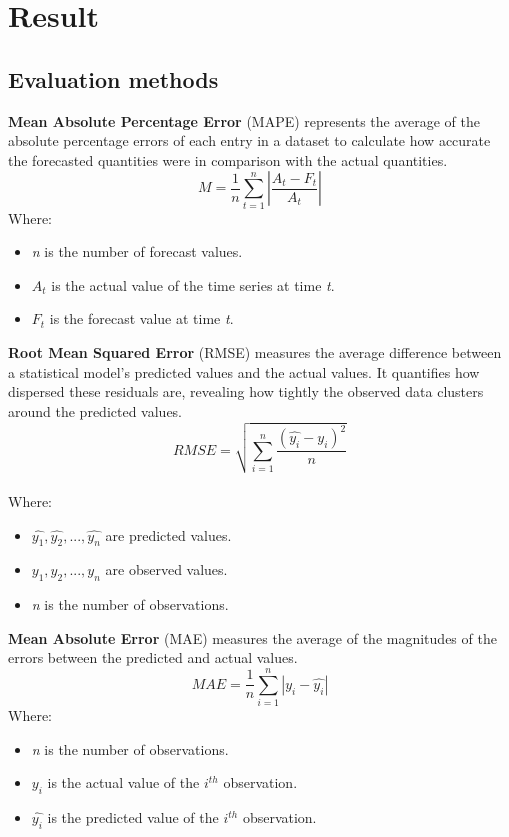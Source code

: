 \documentclass{ieeeojies}
\begin{document}
\section{Result}
\subsection{Evaluation methods}
\textbf{Mean Absolute Percentage  Error} (MAPE) represents the average of the absolute percentage errors of each entry in a dataset to calculate how accurate the forecasted quantities were in comparison with the actual quantities.\\
\[ M = \frac{1}{n} \sum_{t=1}^{n} \left| \frac{A_{t} - F_{t}}{A_{t}} \right| \]
\newline Where:
\begin{itemize}
	\item \textit{n} is the number of forecast values.
	\item $A_{t}$ is the actual value of the time series at time \textit{t}.
	\item $F_{t}$ is the forecast value at time \textit{t}.
\end{itemize}
\textbf{Root Mean Squared Error} (RMSE) measures the average difference between a statistical model’s predicted values and the actual values. It quantifies how dispersed these residuals are, revealing how tightly the observed data clusters around the predicted values.\\
\[RMSE=\sqrt{\sum_{i=1}^{n} \frac{(\hat{y_i}-y_i )^2}{n} }\]\\
\newline Where:
\begin{itemize}
	\item $\hat{y_1}, \hat{y_2}, ..., \hat{y_n}$ are predicted values.
	\item ${y_1}, {y_2}, ..., {y_n}$ are observed values.
	\item \textit{n} is the number of observations.
\end{itemize}
\textbf{Mean Absolute Error} (MAE) measures the average of the magnitudes of the errors between the predicted and actual values.\\
\[MAE=\frac{1}{n}\sum_{i=1}^{n}|y_i - 
\hat{y_i}|\]
\newline Where:
\begin{itemize}
	\item \textit{n} is the number of observations.
	\item $y_i$ is the actual value of the $i^{th}$ observation.
	\item $\hat{y_i}$ is the predicted value of the $i^{th}$ observation.
\end{itemize}
\end{document}
